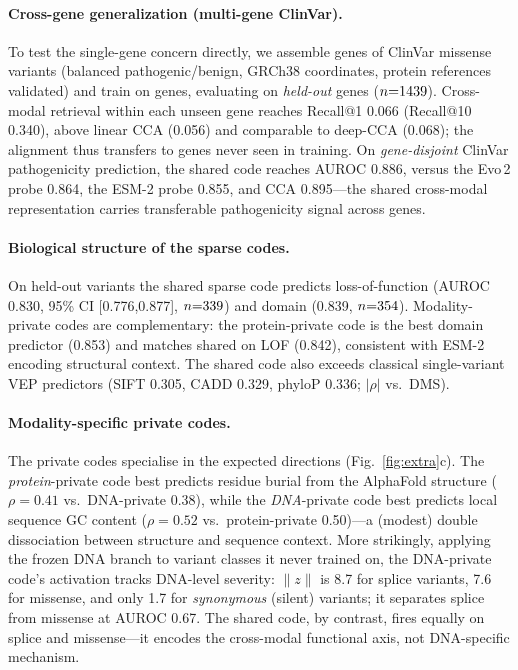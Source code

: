 \paragraph{Cross-gene generalization (multi-gene ClinVar).} To test the single-gene concern directly, we assemble \mgNgenes{} genes of ClinVar missense variants (balanced pathogenic/benign, GRCh38 coordinates, protein references validated) and train on \mgNtrainGenes{} genes, evaluating on \mgNtestGenes{} \emph{held-out} genes ($n{=}1439{}$). Cross-modal retrieval within each unseen gene reaches Recall@1 0.066 (Recall@10 0.340), above linear CCA (0.056) and comparable to deep-CCA (0.068); the alignment thus transfers to genes never seen in training. On \emph{gene-disjoint} ClinVar pathogenicity prediction, the shared code reaches AUROC 0.886, versus the Evo\,2 probe 0.864, the ESM-2 probe 0.855, and CCA 0.895---the shared cross-modal representation carries transferable pathogenicity signal across genes.

\paragraph{Biological structure of the sparse codes.} On held-out variants the shared sparse code predicts loss-of-function (AUROC 0.830, 95\% CI [0.776,0.877], $n{=}339{}$) and domain (0.839, $n{=}354{}$). Modality-private codes are complementary: the protein-private code is the best domain predictor (0.853) and matches shared on LOF (0.842), consistent with ESM-2 encoding structural context. The shared code also exceeds classical single-variant VEP predictors (SIFT 0.305, CADD 0.329, phyloP 0.336; $|\rho|$ vs.\ DMS).

\paragraph{Modality-specific private codes.} The private codes specialise in the expected directions (Fig.~\ref{fig:extra}c). The \emph{protein}-private code best predicts residue burial from the AlphaFold structure ($\rho{=}0.41$ vs.\ DNA-private 0.38), while the \emph{DNA}-private code best predicts local sequence GC content ($\rho{=}0.52$ vs.\ protein-private 0.50)---a (modest) double dissociation between structure and sequence context. More strikingly, applying the frozen DNA branch to variant classes it never trained on, the DNA-private code's activation tracks DNA-level severity: $\lVert z\rVert$ is 8.7 for splice variants, 7.6 for missense, and only 1.7 for \emph{synonymous} (silent) variants; it separates splice from missense at AUROC 0.67. The shared code, by contrast, fires equally on splice and missense---it encodes the cross-modal functional axis, not DNA-specific mechanism.

